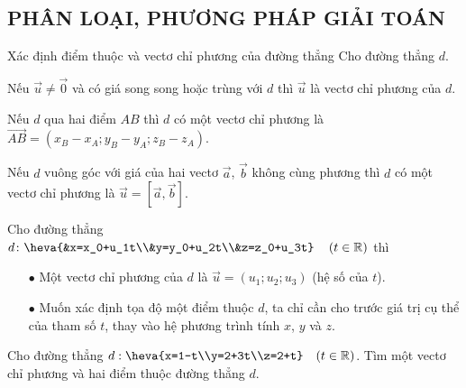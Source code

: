 \subsection{PHÂN LOẠI, PHƯƠNG PHÁP GIẢI TOÁN}
\begin{dang}{Xác định điểm thuộc và vectơ chỉ phương của đường thẳng}
	Cho đường thẳng $d$.
	\begin{listEX}[1]
		\item [\ding{172}] Nếu $\vec{u} \ne \vec{0}$ và có giá song song hoặc trùng với $d$ thì $\vec{u}$ là vectơ chỉ phương của $d$.
		\item [\ding{173}] Nếu $d$ qua hai điểm $AB$ thì $d$ có một vectơ chỉ phương là $\vec{AB}=\left(x_B-x_A; y_B-y_A;z_B-z_A \right)$. 
		\item [\ding{174}] Nếu $d$ vuông góc với giá của hai vectơ $\vec{a}$, $\vec{b}$ không cùng phương thì $d$ có một vectơ chỉ phương là $\vec{u}=[\vec{a},\vec{b}]$.
		\item [\ding{175}] Cho đường thẳng  $d \colon \heva{&x=x_0+u_1t\\&y=y_0+u_2t\\&z=z_0+u_3t} \quad \left( t \in \mathbb{R}\right)$ thì
		\begin{itemize}
			\item [$\bullet$] Một vectơ chỉ phương của $d$ là $\vec{u}=(u_1;u_2;u_3)$ (hệ số của $t$).
			\item [$\bullet$] Muốn xác định tọa độ một điểm thuộc $d$, ta chỉ cần cho trước giá trị cụ thể của tham số $t$, thay vào hệ phương trình tính $x$, $y$ và $z$.
		\end{itemize}
	\end{listEX}
\end{dang}
\viduminhhoa
\setcounter{vd}{0}

\begin{vd}
	Cho đường thẳng $d:\heva{x=1-t\\y=2+3t\\z=2+t}\quad (t\in\mathbb{R})$. Tìm một vectơ chỉ phương và hai điểm thuộc đường thẳng $d$.
	\loigiai{
	}
\end{vd}

